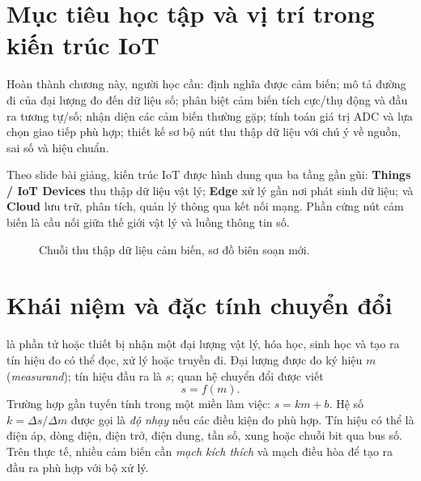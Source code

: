 
\section{Mục tiêu học tập và vị trí trong kiến trúc IoT}
Hoàn thành chương này, người học cần: định nghĩa được cảm biến; mô tả đường đi của đại lượng đo đến dữ liệu số; phân biệt cảm biến tích cực/thụ động và đầu ra tương tự/số; nhận diện các cảm biến thường gặp; tính toán giá trị ADC và lựa chọn giao tiếp phù hợp; thiết kế sơ bộ nút thu thập dữ liệu với chú ý về nguồn, sai số và hiệu chuẩn.

Theo slide bài giảng, kiến trúc IoT được hình dung qua ba tầng gần gũi: \textbf{Things / IoT Devices} thu thập dữ liệu vật lý; \textbf{Edge} xử lý gần nơi phát sinh dữ liệu; và \textbf{Cloud} lưu trữ, phân tích, quản lý thông qua kết nối mạng. Phần cứng nút cảm biến là cầu nối giữa thế giới vật lý và luồng thông tin số.

\begin{figure}[htbp]\centering
{}
\caption{Chuỗi thu thập dữ liệu cảm biến, sơ đồ biên soạn mới.}
\end{figure}

\section{Khái niệm và đặc tính chuyển đổi}
 là phần tử hoặc thiết bị nhận một đại lượng vật lý, hóa học, sinh học và tạo ra tín hiệu đo có thể đọc, xử lý hoặc truyền đi. Đại lượng được đo ký hiệu $m$ (\emph{measurand}); tín hiệu đầu ra là $s$; quan hệ chuyển đổi được viết
\begin{equation}\boxed{s=f(m).}\label{eq:transfer}\end{equation}
Trường hợp gần tuyến tính trong một miền làm việc: $s=km+b$. Hệ số $k=\Delta s/\Delta m$ được gọi là \emph{độ nhạy} nếu các điều kiện đo phù hợp. Tín hiệu có thể là điện áp, dòng điện, điện trở, điện dung, tần số, xung hoặc chuỗi bit qua bus số. Trên thực tế, nhiều cảm biến cần \emph{mạch kích thích} và mạch điều hòa để tạo ra đầu ra phù hợp với bộ xử lý.

